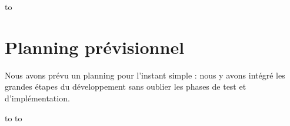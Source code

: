 \documentclass[a4paper,11pt,final]{report}
\begin{document}
    \begin{center}
    \hbox to
    \end{center}


\chapter{Planning prévisionnel}

    Nous avons prévu un planning pour l'instant simple : nous y avons intégré les grandes étapes du développement sans oublier les phases de test et d'implémentation.

    \begin{center}
    \hbox to
    \vspace{2cm}
    \hbox to
    \end{center}
\end{document}
